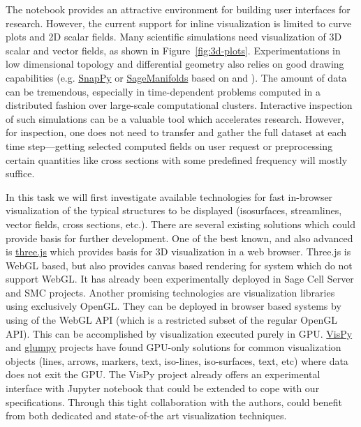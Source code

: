 \begin{workpackage}
\begin{tasklist}
\begin{task}[title=Visualization system for 3D data in web-notebook
,id=vis3d,lead=SR, partners={US,PS,USO}, PM=13, wphases=0-24]

The \Jupyter notebook provides an attractive environment for building
user interfaces for research. However, the current support for inline
visualization is limited to curve plots and 2D scalar fields. Many
scientific simulations need visualization of 3D scalar and vector
fields, as shown in Figure~\ref{fig:3d-plots}.  Experimentations in
low dimensional topology and differential geometry also relies on good
drawing capabilities
(e.g. \href{http://www.math.uic.edu/t3m/SnapPy/}{SnapPy} or
\href{http://sagemanifolds.obspm.fr/}{SageManifolds} based on \IPython
and \Sage). The amount of data can be tremendous, especially in
time-dependent problems computed in a distributed fashion over
large-scale computational clusters. Interactive inspection of such
simulations can be a valuable tool which accelerates
research. However, for inspection, one does not need to transfer and
gather the full dataset at each time step---getting selected computed
fields on user request or preprocessing certain quantities like cross
sections with some predefined frequency will mostly suffice.

In this task we will first investigate available technologies for fast
in-browser visualization of the typical structures to be displayed
(isosurfaces, streamlines, vector fields, cross sections, etc.).
There are several existing solutions which could provide basis for
further development. One of the best known, and also advanced is
\href{http://threejs.org/}{three.js} which provides basis for 3D
visualization in a web browser. Three.js is WebGL based, but also
provides canvas based rendering for system which do not support
WebGL. It has already been experimentally deployed in Sage Cell Server
and SMC projects. Another promising technologies are visualization
libraries using exclusively OpenGL. They can be deployed in browser
based systems by using of the WebGL API (which is a restricted subset
of the regular OpenGL API). This can be accomplished by visualization
executed purely in GPU. \href{http://vispy.org/}{VisPy} and
\href{http://glumpy.github.io/}{glumpy} projects have found GPU-only
solutions for common visualization objects (lines, arrows, markers,
text, iso-lines, iso-surfaces, text, etc) where data does not exit the
GPU. The VisPy project already offers an experimental interface with
Jupyter notebook that could be extended to cope with our
specifications. Through this tight collaboration with the authors,
\TheProject could benefit from both dedicated and state-of-the art
visualization techniques.


\end{task}
\end{tasklist}
\end{workpackage}

